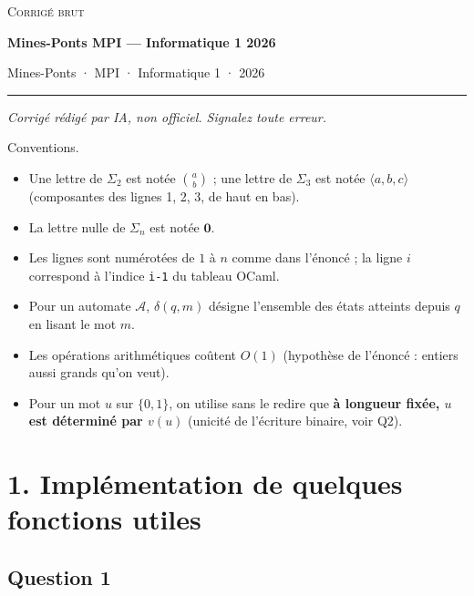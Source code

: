 \documentclass[11pt,a4paper]{article}
\providecommand{\tightlist}{\setlength{\itemsep}{0pt}\setlength{\parskip}{0pt}}
\begin{document}
\thispagestyle{plain}
\begin{center}
  {\small\scshape Corrigé brut}\par\smallskip
  {\LARGE\bfseries Mines-Ponts MPI — Informatique 1 2026\par}\medskip
  {\large Mines-Ponts · MPI · Informatique 1 · 2026\par}
\end{center}
\vspace{2pt}\hrule\vspace{8pt}

\emph{Corrigé rédigé par IA, non officiel. Signalez toute erreur.}

Conventions.

\begin{itemize}
\tightlist
\item
  Une lettre de \(\Sigma_2\) est notée \(\binom{a}{b}\) ; une lettre de \(\Sigma_3\) est notée \(\langle a,b,c\rangle\) (composantes des lignes 1, 2, 3, de haut en bas).
\item
  La lettre nulle de \(\Sigma_n\) est notée \(\mathbf{0}\).
\item
  Les lignes sont numérotées de \(1\) à \(n\) comme dans l'énoncé ; la ligne \(i\) correspond à l'indice \texttt{i-1} du tableau OCaml.
\item
  Pour un automate \(\mathcal{A}\), \(\widehat{\delta}(q,m)\) désigne l'ensemble des états atteints depuis \(q\) en lisant le mot \(m\).
\item
  Les opérations arithmétiques coûtent \(O(1)\) (hypothèse de l'énoncé : entiers aussi grands qu'on veut).
\item
  Pour un mot \(u\) sur \(\{0,1\}\), on utilise sans le redire que \textbf{à longueur fixée, \(u\) est déterminé par \(v(u)\)} (unicité de l'écriture binaire, voir Q2).
\end{itemize}

\hypertarget{impluxe9mentation-de-quelques-fonctions-utiles}{%
\section{1. Implémentation de quelques fonctions utiles}\label{impluxe9mentation-de-quelques-fonctions-utiles}}

\hypertarget{question-1}{%
\subsection{Question 1}\label{question-1}}
\end{document}
